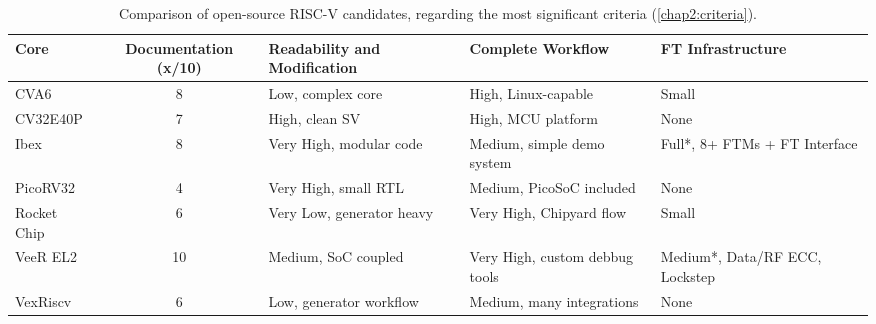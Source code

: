 \begin{table}[H]
\centering
\scriptsize
\setlength{\tabcolsep}{3.2pt}
\renewcommand{\arraystretch}{1.18}
\begin{tabularx}{\textwidth}{|l|c|X|X|X|}
\hline
Core &
Documentation (x/10) &
Readability and Modification &
Complete Workflow &
\ac{FT} Infrastructure \\
\hline
\hline
CVA6 &
8 &
Low, complex core &
High, Linux-capable &
Small \\
\hline
CV32E40P &
7 &
High, clean SV &
High, MCU platform &
None \\
\hline
Ibex &
8 &
Very High, modular code &
Medium, simple demo system &
Full*, 8+ \acp{FTM} + \ac{FT} Interface \\
\hline
PicoRV32 &
4 &
Very High, small RTL &
Medium, PicoSoC included &
None \\
\hline
Rocket Chip &
6 &
Very Low, generator heavy &
Very High, Chipyard flow &
Small \\
\hline
VeeR EL2 &
10 &
Medium, SoC coupled &
Very High, custom debbug tools &
Medium*, Data/RF \ac{ECC}, Lockstep \\
\hline
VexRiscv &
6 &
Low, generator workflow &
Medium, many integrations &
None \\
\hline
\end{tabularx}
\caption{Comparison of open-source RISC-V candidates, regarding the most significant criteria (\cref{chap2:criteria}).}
\label{tab:candidate_comparison_fullcriteria}
\end{table}

